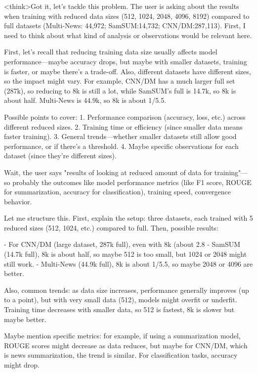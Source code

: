 <think>Got it, let's tackle this problem. The user is asking about the results when training with reduced data sizes (512, 1024, 2048, 4096, 8192) compared to full datasets (Multi-News: 44,972; SamSUM:14,732; CNN/DM:287,113). First, I need to think about what kind of analysis or observations would be relevant here. 

First, let's recall that reducing training data size usually affects model performance—maybe accuracy drops, but maybe with smaller datasets, training is faster, or maybe there's a trade-off. Also, different datasets have different sizes, so the impact might vary. For example, CNN/DM has a much larger full set (287k), so reducing to 8k is still a lot, while SamSUM's full is 14.7k, so 8k is about half. Multi-News is 44.9k, so 8k is about 1/5.5.

Possible points to cover: 
1. Performance comparison (accuracy, loss, etc.) across different reduced sizes. 
2. Training time or efficiency (since smaller data means faster training). 
3. General trends—whether smaller datasets still allow good performance, or if there's a threshold. 
4. Maybe specific observations for each dataset (since they're different sizes). 

Wait, the user says "results of looking at reduced amount of data for training"—so probably the outcomes like model performance metrics (like F1 score, ROUGE for summarization, accuracy for classification), training speed, convergence behavior. 

Let me structure this. First, explain the setup: three datasets, each trained with 5 reduced sizes (512, 1024, etc.) compared to full. Then, possible results:

- For CNN/DM (large dataset, 287k full), even with 8k (about 2.8%
- SamSUM (14.7k full), 8k is about half, so maybe 512 is too small, but 1024 or 2048 might still work. 
- Multi-News (44.9k full), 8k is about 1/5.5, so maybe 2048 or 4096 are better. 

Also, common trends: as data size increases, performance generally improves (up to a point), but with very small data (512), models might overfit or underfit. Training time decreases with smaller data, so 512 is fastest, 8k is slower but maybe better. 

Maybe mention specific metrics: for example, if using a summarization model, ROUGE scores might decrease as data reduces, but maybe for CNN/DM, which is news summarization, the trend is similar. For classification tasks, accuracy might drop. 

